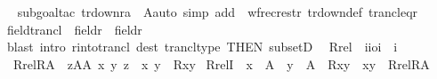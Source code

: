 \begin{isabellebody}
%
\isadelimproof
\ \ %
\endisadelimproof
%
\isatagproof
{}\isamarkupfalse%
{\isacharparenleft}{\kern0pt}subgoal{\isacharunderscore}{\kern0pt}tac\ {\isachardoublequoteopen}tr{\isacharunderscore}{\kern0pt}down{\isacharparenleft}{\kern0pt}r{\isacharcomma}{\kern0pt}a{\isacharparenright}{\kern0pt}\ {\isasymsubseteq}\ A{\isachardoublequoteclose}{\isacharcomma}{\kern0pt}auto\ simp\ add\ {\isacharcolon}{\kern0pt}\ wfrec{\isacharunderscore}{\kern0pt}restr\ tr{\isacharunderscore}{\kern0pt}down{\isacharunderscore}{\kern0pt}def\ trancl{\isacharunderscore}{\kern0pt}eq{\isacharunderscore}{\kern0pt}r{\isacharparenright}{\kern0pt}%
\endisatagproof
{\isafoldproof}%
%
\isadelimproof
\isanewline
%
\endisadelimproof
\isanewline
\isanewline
{}\isamarkupfalse%
\ field{\isacharunderscore}{\kern0pt}trancl\ {\isacharcolon}{\kern0pt}\ {\isachardoublequoteopen}field{\isacharparenleft}{\kern0pt}r{\isacharcircum}{\kern0pt}{\isacharplus}{\kern0pt}{\isacharparenright}{\kern0pt}\ {\isacharequal}{\kern0pt}\ field{\isacharparenleft}{\kern0pt}r{\isacharparenright}{\kern0pt}{\isachardoublequoteclose}\isanewline
%
\isadelimproof
\ \ %
\endisadelimproof
%
\isatagproof
{}\isamarkupfalse%
\ {\isacharparenleft}{\kern0pt}blast\ intro{\isacharcolon}{\kern0pt}\ r{\isacharunderscore}{\kern0pt}into{\isacharunderscore}{\kern0pt}trancl\ dest{\isacharbang}{\kern0pt}{\isacharcolon}{\kern0pt}\ trancl{\isacharunderscore}{\kern0pt}type\ {\isacharbrackleft}{\kern0pt}THEN\ subsetD{\isacharbrackright}{\kern0pt}{\isacharparenright}{\kern0pt}%
\endisatagproof
{\isafoldproof}%
%
\isadelimproof
\isanewline
%
\endisadelimproof
\isanewline
{}\isamarkupfalse%
\isanewline
\ \ Rrel\ {\isacharcolon}{\kern0pt}{\isacharcolon}{\kern0pt}\ {\isachardoublequoteopen}{\isacharbrackleft}{\kern0pt}i{\isasymRightarrow}i{\isasymRightarrow}o{\isacharcomma}{\kern0pt}i{\isacharbrackright}{\kern0pt}\ {\isasymRightarrow}\ i{\isachardoublequoteclose}\ \isanewline
\ \ {\isachardoublequoteopen}Rrel{\isacharparenleft}{\kern0pt}R{\isacharcomma}{\kern0pt}A{\isacharparenright}{\kern0pt}\ {\isasymequiv}\ {\isacharbraceleft}{\kern0pt}z{\isasymin}A{\isasymtimes}A{\isachardot}{\kern0pt}\ {\isasymexists}x\ y{\isachardot}{\kern0pt}\ z\ {\isacharequal}{\kern0pt}\ {\isasymlangle}x{\isacharcomma}{\kern0pt}\ y{\isasymrangle}\ {\isasymand}\ R{\isacharparenleft}{\kern0pt}x{\isacharcomma}{\kern0pt}y{\isacharparenright}{\kern0pt}{\isacharbraceright}{\kern0pt}{\isachardoublequoteclose}\isanewline
\isanewline
{}\isamarkupfalse%
\ RrelI\ {\isacharcolon}{\kern0pt}\ {\isachardoublequoteopen}x\ {\isasymin}\ A\ {\isasymLongrightarrow}\ y\ {\isasymin}\ A\ {\isasymLongrightarrow}\ R{\isacharparenleft}{\kern0pt}x{\isacharcomma}{\kern0pt}y{\isacharparenright}{\kern0pt}\ {\isasymLongrightarrow}\ {\isasymlangle}x{\isacharcomma}{\kern0pt}y{\isasymrangle}\ {\isasymin}\ Rrel{\isacharparenleft}{\kern0pt}R{\isacharcomma}{\kern0pt}A{\isacharparenright}{\kern0pt}{\isachardoublequoteclose}\isanewline

\end{isabellebody}
